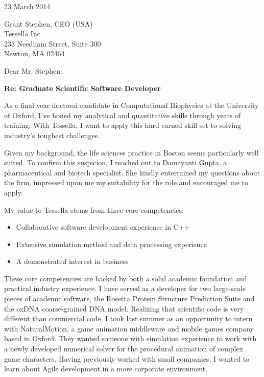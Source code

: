 \documentclass{../res}
\begin{document}
 
\begin{sloppypar}
 
%


\begin{resume} 
 
23 March 2014

Grant Stephen, CEO (USA) \\
Tessella Inc \\
233 Needham Street, Suite 300 \\
Newton, MA 02464

Dear Mr. Stephen: %

\textbf{Re: Graduate Scientific Software Developer}

As a final year doctoral candidate in Computational Biophysics at the University of Oxford, I've honed my analytical and quantitative skills through years of training. With Tessella, I want to apply this hard earned skill set to solving industry's toughest challenges. 

Given my background, the life sciences practice in Boston seems particularly well suited. To confirm this suspicion, I reached out to Damayanti Gupta, a pharmaceutical and biotech specialist. She kindly entertained my questions about the firm, impressed upon me my suitability for the role and encouraged me to apply.

My value to Tessella stems from three core competencies: 
\begin{itemize}[itemindent=1cm]
    \item Collaborative software development experience in C++
    \item Extensive simulation method and data processing experience
    \item A demonstrated interest in business
\end{itemize}

These core competencies are backed by both a solid academic foundation and practical industry experience. I have served as a developer for two large-scale pieces of academic software, the Rosetta Protein Structure Prediction Suite and the oxDNA coarse-grained DNA model. Realizing that scientific code is very different than commercial code, I took last summer as an opportunity to intern with NaturalMotion, a game animation middleware and mobile games company based in Oxford. They wanted someone with simulation experience to work with a newly developed numerical solver for the procedural animation of complex game characters. Having previously worked with small companies, I wanted to learn about Agile development in a more corporate environment. 


\end{resume}
\end{sloppypar}
\end{document}
